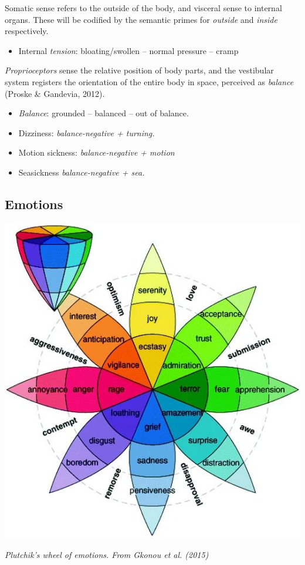 Somatic sense refers to the outside of the body, and visceral sense to internal organs. These will be codified by the semantic primes for \textit{outside} and \textit{inside} respectively.   

\begin{itemize}
	\item Internal \textit{tension}: bloating/swollen – normal pressure – cramp  
\end{itemize}

{\it Proprioceptors} sense the relative position of body parts, and the vestibular system registers the orientation of the entire body in space, perceived as \textit{balance} (Proske \& Gandevia, 2012).  

\begin{itemize}
	\item \textit{Balance}: grounded – balanced – out of balance.  

	\item Dizziness: \textit{balance-negative + turning.} 

	\item Motion sickness:  \textit{ balance-negative + motion } 

	\item Seasickness \textit{balance-negative + sea.} 
\end{itemize}


\subsection{Emotions}

\begin{center}
	\includegraphics[scale=0.45]{./Images/emotions.jpg}

	{\it \footnotesize Plutchik's wheel of emotions. From Gkonou et al. (2015)}
\end{center}

